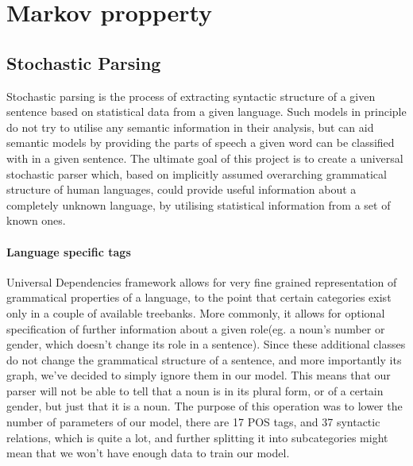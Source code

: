 \chapter{Markov propperty}
\section{Stochastic Parsing}
Stochastic parsing is the process of extracting syntactic structure of a given sentence based on 
statistical data from a given language. Such models in principle do not try to utilise any
semantic information in their analysis, but can aid semantic models by providing the parts of speech
a given word can be classified with in a given sentence. The ultimate goal of this project
is to create a universal stochastic parser which, based on implicitly assumed overarching
grammatical structure of human languages, could provide useful information about a completely
unknown language, by utilising statistical information from a set of known ones.
\subsubsection{Language specific tags}
Universal Dependencies framework allows for very fine grained representation of grammatical properties of a language,
to the point that certain categories exist only in a couple of available treebanks. More commonly, it allows for optional
specification of further information about a given role(eg. a noun's number or gender, which doesn't change its role in a sentence).
Since these additional classes do not change the grammatical structure of a sentence, and more importantly its graph, we've
decided to simply ignore them in our model. This means that our parser will not be able to tell that a noun is in its plural
form, or of a certain gender, but just that it is a noun. The purpose of this operation was to lower the number of parameters of our
model, there are 17 POS tags, and 37 syntactic relations, which is quite a lot, and further splitting it into subcategories might
mean that we won't have enough data to train our model.
